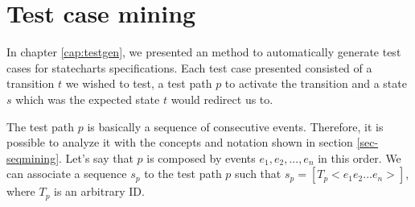 \section{Test case mining}
\label{sec-testsequence}

In chapter \ref{cap:testgen}, we presented an method to automatically generate test cases for statecharts specifications. Each test case presented consisted of a transition $t$ we wished to test, a test path $p$ to activate the transition and a state $s$ which was the expected state $t$ would redirect us to.

The test path $p$ is basically a sequence of consecutive events. Therefore, it is possible to analyze it with the concepts and notation shown in section \ref{sec-seqmining}. Let's say that $p$ is composed by events $e_1,e_2,...,e_n$ in this order. We can associate a sequence $s_p$ to the test path $p$ such that $s_p = [T_p < e_1e_2...e_n >]$, where $T_p$ is an arbitrary ID.
